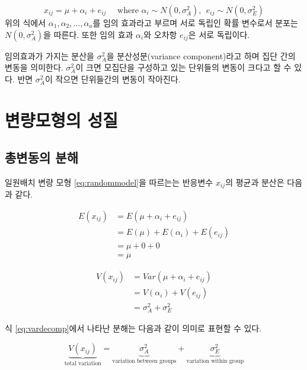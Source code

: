 \documentclass[
]{book}
\theoremstyle{definition}
\theoremstyle{definition}
\theoremstyle{definition}
\theoremstyle{remark}
\begin{document}
\begin{equation}
x_{ij} = \mu + \alpha_i + e_{ij} \quad \text{ where } \alpha_i \sim N(0,\sigma_A^2),~~ e_{ij} \sim N(0,\sigma_E^2)
\label{eq:randommodel}
\end{equation}
위의 식에서 \(\alpha_1, \alpha_2, \dots, \alpha_a\)를 임의 효과라고 부르며 서로 독립인 확률 변수로서 분포는 \(N(0,\sigma_A^2)\)을 따른다. 또한 임의 효과 \(\alpha_i\)와 오차항 \(e_{ij}\)은 서로 독립이다.

임의효과가 가지는 분산을 \(\sigma_A^2\)을 분산성분(variance component)라고 하며 집단 간의 변동을 의미한다. \(\sigma_A^2\)이 크면 모집단을 구성하고 있는 단위들의 변동이 크다고 할 수 있다. 반면 \(\sigma_A^2\)이 작으면 단위들간의 변동이 작아진다.

\hypertarget{uxbcc0uxb7c9uxbaa8uxd615uxc758-uxc131uxc9c8}{%
\section{변량모형의 성질}\label{uxbcc0uxb7c9uxbaa8uxd615uxc758-uxc131uxc9c8}}

\hypertarget{uxcd1duxbcc0uxb3d9uxc758-uxbd84uxd574}{%
\subsection{총변동의 분해}\label{uxcd1duxbcc0uxb3d9uxc758-uxbd84uxd574}}

일원배치 변량 모형 \eqref{eq:randommodel}을 따르는는 반응변수 \(x_{ij}\)의 평균과 분산은 다음과 같다.

\begin{align*}
E(x_{ij}) & = E(\mu + \alpha_i + e_{ij}) \\
  & =E(\mu) + E(\alpha_i) + E(e_{ij})  \\
  &= \mu + 0 + 0 \\
  & = \mu 
\end{align*}

\begin{align}
V(x_{ij}) & =Var(\mu + \alpha_i + e_{ij}) \\
  & = V(\alpha_i) + V(e_{ij}) \\
  & = \sigma^2_A + \sigma^2_E 
\label{eq:vardecomp}
\end{align}

식 \eqref{eq:vardecomp}에서 나타난 분해는 다음과 같이 의미로 표현할 수 있다.

\[ \underbrace{V(x_{ij})}_{\text{total variation}} =  \underbrace{\sigma^2_A}_{\text{variation between groups}} + \underbrace{\sigma^2_E}_{\text{variation within group}}  \]
\end{document}
